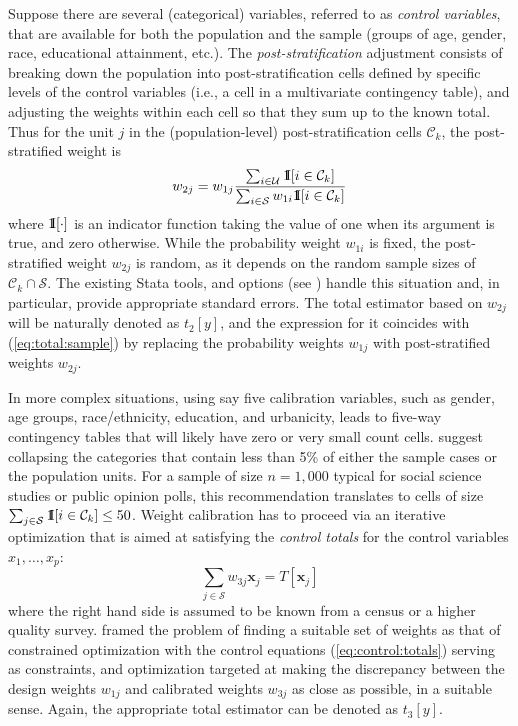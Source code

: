 Suppose there are several (categorical) variables, referred to
as {\it control variables}, that are available for both
the population and the sample
(groups of age, gender, race, educational attainment, etc.).
The {\it post-stratification} adjustment consists of breaking down
the population into post-stratification cells defined
by specific levels of the control variables (i.e., a cell in a multivariate
contingency table), and adjusting the weights within each cell
so that they sum up to the known total.
Thus for the unit $j$ in the (population-level) post-stratification cells $\mathcal{C}_k$, the post-stratified weight is
\begin{equation}
   w_{2j} = w_{1j} \frac%
        {\sum_{i \in \mathcal{U}} \One[i \in \mathcal{C}_k]}%
        {\sum_{i \in \mathcal{S}} w_{1i} \One[i \in \mathcal{C}_k]}%
   \label{eq:ps:weight}
\end{equation}
where ${\rm 1\kern-.3em I}[\cdot]$ is an indicator function taking the value of one
when its argument is true, and zero otherwise.
While the probability weight $w_{1i}$ is fixed, the post-stratified weight
$w_{2j}$ is random, as it depends on the random sample sizes of
$\mathcal{C}_k \cap \mathcal{S}$.
The existing Stata tools,  and 
options (see ) handle this situation and,
in particular, provide appropriate standard errors. The total estimator
based on $w_{2j}$ will be naturally denoted as $t_2[y]$, and the expression
for it coincides with (\ref{eq:total:sample}) by replacing the probability
weights $w_{1j}$ with post-stratified weights $w_{2j}$.

In more complex situations, using say five calibration variables,
such as gender, age groups, race/ethnicity, education, and urbanicity,
leads to five-way contingency tables that will likely have zero or
very small count cells. \citet{batt:izra:hoag:fran:2009} suggest
collapsing the categories that contain less than 5\% of either
the sample cases or the population units. For a sample of size
$n=1,000$ typical for social science studies or public opinion polls, 
this recommendation translates to cells of size
$\sum_{j \in \mathcal{S}} {\rm 1\kern-.3em I}[i \in \mathcal{C}_k] \le 50$.
Weight calibration has to proceed
via an iterative optimization that is aimed at satisfying
the {\it control totals} for the control variables $x_1, \ldots, x_p$:
\begin{equation}
    \sum_{j \in \mathcal{S}} w_{3j} \mathbf{x}_j
    = T [ \mathbf{x}_j  ]
    \label{eq:control:totals}
\end{equation}
where the right hand side is assumed to be known from a census or
a higher quality survey.
\citet{deville:sarndal:1992} framed the problem of finding a suitable
set of weights as that of constrained optimization with the control
equations (\ref{eq:control:totals}) serving as constraints,
and optimization targeted at making the discrepancy between
the design weights $w_{1j}$ and calibrated weights
$w_{3j}$ as close as possible, in a suitable sense. Again,
the appropriate total estimator can be denoted as $t_3[y]$.

